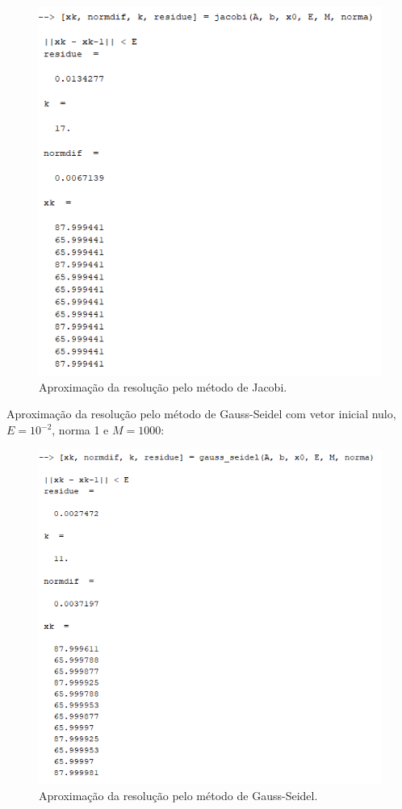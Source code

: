 \documentclass[11pt]{article}
\begin{document}
\begin{enumerate}
    \begin{figure}[H]
    \centering
    \includegraphics[]{6-b-resolution-Jacobi}
    \caption{Aproximação da resolução pelo método de Jacobi.}
    \end{figure}
    
    Aproximação da resolução pelo método de Gauss-Seidel com vetor inicial nulo, $E = 10^{-2}$, norma 1 e $M = 1000$:

    \begin{figure}[H]
    \centering
    \includegraphics[]{6-b-resolution-Gauss-Seidel}
    \caption{Aproximação da resolução pelo método de Gauss-Seidel.}
    \end{figure}

\end{enumerate}
\end{document}
